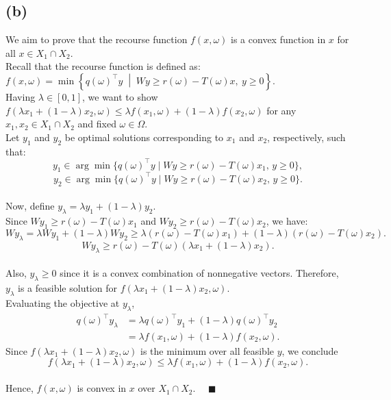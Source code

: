 \documentclass[8pt]{article}
\begin{document}
\subsection*{(b)}
We aim to prove that the recourse function $f(x, \omega)$ is a convex function in $x$ for all $x \in X_1 \cap X_2$. \\ [0.3em]
Recall that the recourse function is defined as: $f(x, \omega) = \min \left\{ q(\omega)^\top y \;\middle|\; Wy \geq r(\omega) - T(\omega)x,\ y \geq 0 \right\}.$ \\ [0.3em] 
Having $\lambda \in [0,1]$, we want to show $f(\lambda x_1 + (1-\lambda)x_2, \omega) \leq \lambda f(x_1, \omega) + (1-\lambda) f(x_2, \omega)$ for any $x_1, x_2 \in X_1 \cap X_2$ and fixed $\omega \in \Omega$.  \\ [0.3em]
Let $y_1$ and $y_2$ be optimal solutions corresponding to $x_1$ and $x_2$, respectively, such that:
$$
y_1 \in \arg\min\{ q(\omega)^\top y \mid Wy \geq r(\omega) - T(\omega)x_1,\, y \geq 0\},
$$
$$
y_2 \in \arg\min\{ q(\omega)^\top y \mid Wy \geq r(\omega) - T(\omega)x_2,\, y \geq 0\}.
$$ \\[-0.4em]
Now, define $y_\lambda = \lambda y_1 + (1-\lambda) y_2 $. \\ [0.3em]
Since $Wy_1 \geq r(\omega) - T(\omega)x_1$ and $Wy_2 \geq r(\omega) - T(\omega)x_2$, we have:
$$
W y_\lambda = \lambda W y_1 + (1-\lambda) W y_2 \geq \lambda (r(\omega) - T(\omega)x_1) + (1-\lambda)(r(\omega) - T(\omega)x_2).
$$
$$
W y_\lambda \geq r(\omega) - T(\omega)(\lambda x_1 + (1-\lambda)x_2).
$$ \\[-0.4em]
Also, $y_\lambda \geq 0$ since it is a convex combination of nonnegative vectors.
Therefore, $y_\lambda$ is a feasible solution for $f(\lambda x_1 + (1-\lambda)x_2, \omega)$. \\ [0.3em]
Evaluating the objective at $y_\lambda$,
\begin{align*}
q(\omega)^\top y_\lambda &= \lambda q(\omega)^\top y_1 + (1-\lambda) q(\omega)^\top y_2 \\
&= \lambda f(x_1, \omega) + (1-\lambda) f(x_2, \omega).
\end{align*}
Since $f(\lambda x_1 + (1-\lambda)x_2, \omega)$ is the minimum over all feasible $y$, we conclude
$$
f(\lambda x_1 + (1-\lambda)x_2, \omega) \leq \lambda f(x_1, \omega) + (1-\lambda) f(x_2, \omega).
$$ \\[-0.4em]
Hence, $f(x, \omega)$ is convex in $x$ over $X_1 \cap X_2$. $\quad \blacksquare$
\end{document}
